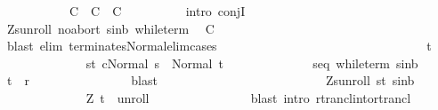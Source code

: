 \begin{isabellebody}
\ \ \ \ \ \ \ \ \ \ {\isacharparenleft}\ {\isachardoublequoteopen}{\isacharquery}C{}\ {\isasymand}\ {\isacharquery}C{}\ {\isasymand}\ {\isacharquery}C{}{\isachardoublequoteclose}{\isacharparenright}\isanewline
\ \ \ \ \ \ \ \ \isamarkupfalse%
\ {\isacharparenleft}intro\ conjI{\isacharparenright}\isanewline
\ \ \ \ \ \ \ \ \ \ \isamarkupfalse%
\ Z{\isacharunderscore}s{\isacharunderscore}unroll\ noabort\ s{\isacharunderscore}in{\isacharunderscore}b\ while{\isacharunderscore}term\ \isamarkupfalse%
\ {\isacharquery}C{}\ \isanewline
\ \ \ \ \ \ \ \ \ \ \ \ \isamarkupfalse%
\ {\isacharparenleft}blast\ elim{\isacharcolon}\ terminates{\isacharunderscore}Normal{\isacharunderscore}elim{\isacharunderscore}cases{\isacharparenright}\isanewline
\ \ \ \ \ \ \ \ \isamarkupfalse%
\isanewline
\ \ \ \ \ \ \ \ \ \ \isacommand{{\isacharbraceleft}}\isamarkupfalse%
\isanewline
\ \ \ \ \ \ \ \ \ \ \ \ \isamarkupfalse%
\ t\ \isanewline
\ \ \ \ \ \ \ \ \ \ \ \ \isamarkupfalse%
\ s{\isacharunderscore}t{\isacharcolon}\ {\isachardoublequoteopen}{\isasymGamma}{\isasymturnstile}{\isasymlangle}c{\isacharcomma}Normal\ s{\isasymrangle}\ {\isasymRightarrow}\ Normal\ t{\isachardoublequoteclose}\isanewline
\ \ \ \ \ \ \ \ \ \ \ \ \isamarkupfalse%
\ s{\isacharunderscore}eq{\isacharunderscore}{\isasymsigma}\ while{\isacharunderscore}term\ s{\isacharunderscore}in{\isacharunderscore}b\ \isamarkupfalse%
\ {\isachardoublequoteopen}{\isacharparenleft}t{\isacharcomma}{\isasymsigma}{\isacharparenright}\ {\isasymin}\ {\isacharquery}r{\isachardoublequoteclose}\isanewline
\ \ \ \ \ \ \ \ \ \ \ \ \ \ \isamarkupfalse%
\ blast\isanewline
\ \ \ \ \ \ \ \ \ \ \ \ \isamarkupfalse%
\isanewline
\ \ \ \ \ \ \ \ \ \ \ \ \isamarkupfalse%
\ Z{\isacharunderscore}s{\isacharunderscore}unroll\ s{\isacharunderscore}t\ s{\isacharunderscore}in{\isacharunderscore}b\ \isanewline
\ \ \ \ \ \ \ \ \ \ \ \ \isamarkupfalse%
\ {\isachardoublequoteopen}{\isacharparenleft}Z{\isacharcomma}\ t{\isacharparenright}\ {\isasymin}\ {\isacharquery}unroll{\isachardoublequoteclose}\isanewline
\ \ \ \ \ \ \ \ \ \ \ \ \ \ \isamarkupfalse%
\ {\isacharparenleft}blast\ intro{\isacharcolon}\ rtrancl{\isacharunderscore}into{\isacharunderscore}rtrancl{\isacharparenright}\isanewline
\ \ \ \ \ \ \ \ \ \ \ \ \isamarkupfalse%
\ \isamarkupfalse%

\end{isabellebody}
